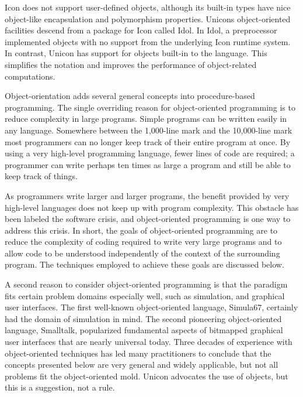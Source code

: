 Icon does not support user-defined objects, although its built-in types
have nice object-like encapsulation and polymorphism properties.
Unicon{\textquotesingle}s object-oriented facilities descend from a
package for Icon called Idol. In Idol, a preprocessor
implemented objects with no support from the underlying Icon runtime
system. In contrast, Unicon has support for objects built-in to the
language. This simplifies the notation and improves the performance of
object-related computations.

Object-orientation adds several general concepts into procedure-based
programming. The single overriding reason for object-oriented programming is to reduce complexity in
large programs. Simple programs can be written easily in any language.
Somewhere between the 1,000-line mark and the 10,000-line mark most
programmers can no longer keep track of their entire program at once.
By using a very high-level programming language, fewer lines of code
are required; a programmer can write perhaps ten times as large a
program and still be able to keep track of things.

As programmers write larger and larger programs, the benefit provided by
very high-level languages does not keep
up with program complexity. This obstacle has been labeled the
{\textquotedbl}software crisis,{\textquotedbl} and object-oriented
programming is one way to address this crisis. In short, the goals of
object-oriented programming are to reduce the complexity of coding
required to write very large programs and to allow code to be
understood independently of the context of the surrounding program. The
techniques employed to achieve these goals are discussed below. 

A second reason to consider object-oriented programming is that the
paradigm fits certain problem domains especially well, such as
simulation, and graphical user interfaces. The first well-known
object-oriented language, Simula67, certainly had the
domain of simulation in mind. The second pioneering object-oriented
language, Smalltalk, popularized fundamental aspects of bitmapped
graphical user interfaces that are nearly universal today. Three
decades of experience with object-oriented techniques has led many
practitioners to conclude that the concepts presented below are very
general and widely applicable, but not all problems fit the
object-oriented mold. Unicon advocates the use of objects, but this is
a suggestion, not a rule. 

